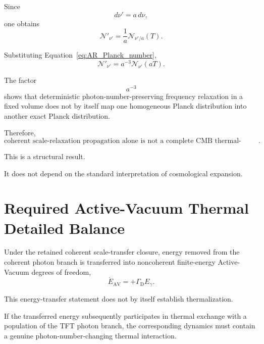 Since
\begin{equation}
    d\nu'
    =
    a\,d\nu,
\end{equation}
one obtains
\begin{equation}
    \mathcal N'_{\nu'}
    =
    \frac{1}{a}
    \mathcal N_{\nu'/a}(T).
    \label{eq:AR_CMB_transform1}
\end{equation}

Substituting Equation~\eqref{eq:AR_Planck_number},
\begin{equation}
    \boxed{
    \mathcal N'_{\nu'}
    =
    a^{-3}
    \mathcal N_{\nu'}(aT).
    }
    \label{eq:AR_CMB_transform2}
\end{equation}

The factor
\begin{equation}
    a^{-3}
\end{equation}
shows that deterministic photon-number-preserving frequency relaxation in a
fixed volume does not by itself map one homogeneous Planck distribution into
another exact Planck distribution.

Therefore,
\begin{equation}
    \boxed{
    \text{coherent scale-relaxation propagation alone is not a complete
    CMB thermal-evolution law}.
    }
    \label{eq:AR_CMB_nogo}
\end{equation}

This is a structural result.

It does not depend on the standard interpretation of cosmological expansion.


\section{Required Active-Vacuum Thermal Detailed Balance}

Under the retained coherent scale-transfer closure, energy removed from the
coherent photon branch is transferred into noncoherent finite-energy
Active-Vacuum degrees of freedom,
\begin{equation}
    \dot E_{\mathrm{AV}}
    =
    +\Gamma_{\mathrm D}E_\gamma.
\end{equation}

This energy-transfer statement does not by itself establish thermalization.

If the transferred energy subsequently participates in thermal exchange with a
population of the TFT photon branch, the corresponding dynamics must contain a
genuine photon-number-changing thermal interaction.

